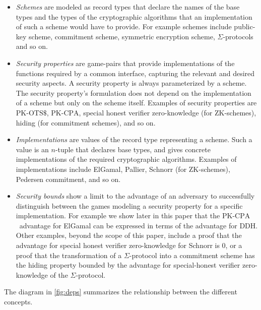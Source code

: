 \documentclass[a4paper,USenglish,cleveref, autoref]{lipics-v2021}
\newcommand{\CPA}{\ensuremath{\mathrm{PK\text{-}CPA}}}
\newcommand{\OTSR}{\ensuremath{\mathrm{PK\text{-}OTS\$}}}
\newcommand{\DDH}{\ensuremath{\mathrm{DDH}}}
\begin{document}
\begin{itemize}
\item \emph{Schemes} are modeled as record types that declare the names of the base types and the types of the cryptographic algorithms that an implementation of such a scheme would have to provide. For example schemes include public-key scheme, commitment scheme, symmetric encryption scheme, $\Sigma$-protocols and so on.

\item \emph{Security properties} are game-pairs that provide implementations of the functions required by a common interface, capturing the relevant and desired security aspects. A security property is always parameterized by a scheme. The security property's formulation does not depend on the implementation of a scheme but only on the scheme itself. Examples of security properties are \OTSR, \CPA, special honest verifier zero-knowledge (for ZK-schemes), hiding (for commitment schemes), and so on.

\item \emph{Implementations} are values of the record type representing a scheme.  Such a value is an $n$-tuple that declares base types, and gives concrete implementations of the required cryptographic algorithms.
  Examples of implementations include ElGamal, Pallier, Schnorr (for ZK-schemes), Pedersen commitment, and so on.

\item \emph{Security bounds} show a limit to the advantage of an adversary to successfully distinguish between the games modeling a security property for a specific implementation.
  For example we show later in this paper that the \CPA\ advantage for ElGamal can be expressed in terms of the advantage for \DDH. Other examples, beyond the scope of this paper, include a proof that the advantage for special honest verifier zero-knowledge for Schnorr is 0, or a proof that the transformation of a $\Sigma$-protocol into a commitment scheme has the hiding property bounded by the advantage for special-honest verifier zero-knowledge of the $\Sigma$-protocol.
\end{itemize}

The diagram in \cref{fig:deps} summarizes the relationship between the different concepts.
\end{document}
